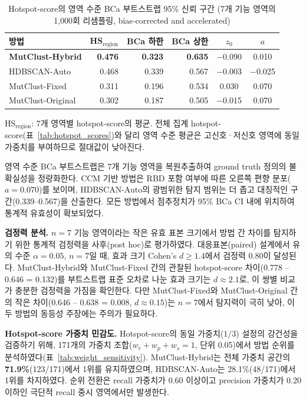 \begin{table}[htbp]
\centering
\caption{Hotspot-score의 영역 수준 BCa 부트스트랩 95\% 신뢰 구간 (7개 기능 영역의 1,000회 리샘플링, bias-corrected and accelerated)}
\label{tab:bootstrap_ci}
\begin{tabular}{lrrrcc}
\toprule
\textbf{방법} & \textbf{HS$_{\text{region}}$} & \textbf{BCa 하한} & \textbf{BCa 상한} & \textbf{$z_0$} & \textbf{$a$} \\
\midrule
\textbf{MutClust-Hybrid} & \textbf{0.476} & \textbf{0.323} & \textbf{0.635} & $-$0.090 & 0.010 \\
HDBSCAN-Auto & 0.468 & 0.339 & 0.567 & $-$0.003 & $-$0.025 \\
MutClust-Fixed & 0.311 & 0.196 & 0.534 & 0.030 & 0.070 \\
MutClust-Original & 0.302 & 0.187 & 0.505 & $-$0.015 & 0.070 \\
\bottomrule
\end{tabular}
\begin{minipage}{\textwidth}
\smallskip
\footnotesize HS$_{\text{region}}$: 7개 영역별 hotspot-score의 평균. 전체 집계 hotspot-score(표~\ref{tab:hotspot_scores})와 달리 영역 수준 평균은 고신호·저신호 영역에 동일 가중치를 부여하므로 절대값이 낮아진다.
\end{minipage}
\end{table}

영역 수준 BCa 부트스트랩은 7개 기능 영역을 복원추출하여 ground truth 정의의 불확실성을 정량화한다.
CCM 기반 방법은 RBD 포함 여부에 따른 오른쪽 편향 분포($a = 0.070$)를 보이며, HDBSCAN-Auto의 광범위한 탐지 범위는 더 좁고 대칭적인 구간(0.339--0.567)을 산출한다. 모든 방법에서 점추정치가 95\% BCa CI 내에 위치하여 통계적 유효성이 확보되었다.

\textbf{검정력 분석.}
$n = 7$ 기능 영역이라는 작은 유효 표본 크기에서 방법 간 차이를 탐지하기 위한 통계적 검정력을 사후(post hoc)로 평가하였다.
대응표본(paired) 설계에서 유의 수준 $\alpha = 0.05$, $n = 7$일 때, 효과 크기 Cohen's $d \geq 1.4$에서 검정력 0.80이 달성된다.
MutClust-Hybrid와 MutClust-Fixed 간의 관찰된 hotspot-score 차이(0.778 -- 0.646 = 0.132)를 부트스트랩 표준 오차로 나눈 효과 크기는 $d \approx 2.1$로, 이 쌍별 비교가 충분한 검정력을 가짐을 확인한다.
다만 MutClust-Fixed와 MutClust-Original 간의 작은 차이(0.646 -- 0.638 = 0.008, $d \approx 0.15$)는 $n = 7$에서 탐지력이 극히 낮아, 이 두 방법의 동등성 주장에는 주의가 필요하다.

\textbf{Hotspot-score 가중치 민감도.}
Hotspot-score의 동일 가중치($1/3$) 설정의 강건성을 검증하기 위해, 171개의 가중치 조합($w_r + w_p + w_s = 1$, 단위 0.05)에서 방법 순위를 분석하였다(표~\ref{tab:weight_sensitivity}).
MutClust-Hybrid는 전체 가중치 공간의 \textbf{71.9\%}(123/171)에서 1위를 유지하였으며, HDBSCAN-Auto는 28.1\%(48/171)에서 1위를 차지하였다.
순위 전환은 recall 가중치가 0.60 이상이고 precision 가중치가 0.20 이하인 극단적 recall 중시 영역에서만 발생한다.

